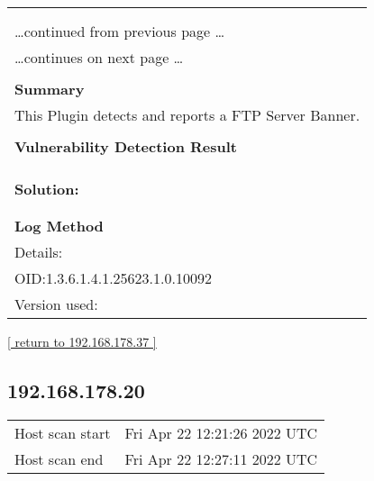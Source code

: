 \documentclass{article}
\begin{document}
\begin{longtable}{|p{}|}
\hline
\rowcolor{gvm_log}{\color{white}{Log (CVSS: 0.0) }}\\
\rowcolor{gvm_log}{\color{white}{NVT: FTP Banner Detection}}\\
\hline
\endfirsthead
\hfill\ldots continued from previous page \ldots \\
\hline
\endhead
\hline
\ldots continues on next page \ldots \\
\endfoot
\hline
\endlastfoot
\\
\textbf{Summary}\\
This Plugin detects and reports a FTP Server Banner.\\

        \hline
        \\
\textbf{Vulnerability Detection Result}\\
\rowcolor{white}{\verb=Remote FTP server banner:=}\\
\rowcolor{white}{\verb=220 Welcome to the opendreambox FTP service!=}\\

          \hline
          \\
\textbf{Solution:}\\
\\


        \hline
        \\
\textbf{Log Method}\\
Details:
\rowcolor{white}{\verb=FTP Banner Detection=}\\
OID:1.3.6.1.4.1.25623.1.0.10092\\
Version used:
\rowcolor{white}{\verb=2022-02-16T13:39:14Z=}\\
\end{longtable}

\begin{footnotesize}\hyperref[host:192.168.178.37]{[ return to 192.168.178.37 ]}\end{footnotesize}
\subsection{192.168.178.20}
\label{host:192.168.178.20}

\begin{tabular}{ll}
Host scan start&Fri Apr 22 12:21:26 2022 UTC\\
Host scan end&Fri Apr 22 12:27:11 2022 UTC\\
\end{tabular}
\end{document}
